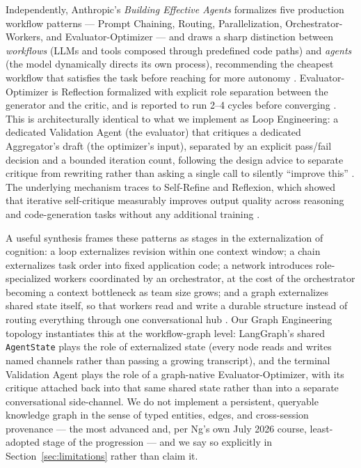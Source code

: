 \documentclass[journal,10pt,compsoc,onecolumn]{IEEEtran}
\begin{document}
Independently, Anthropic's \textit{Building Effective Agents} formalizes five production workflow patterns --- Prompt Chaining, Routing, Parallelization, Orchestrator-Workers, and Evaluator-Optimizer --- and draws a sharp distinction between \textit{workflows} (LLMs and tools composed through predefined code paths) and \textit{agents} (the model dynamically directs its own process), recommending the cheapest workflow that satisfies the task before reaching for more autonomy \cite{schluntz_zhang_2024}. Evaluator-Optimizer is Reflection formalized with explicit role separation between the generator and the critic, and is reported to run 2--4 cycles before converging \cite{schluntz_zhang_2024}. This is architecturally identical to what we implement as Loop Engineering: a dedicated Validation Agent (the evaluator) that critiques a dedicated Aggregator's draft (the optimizer's input), separated by an explicit pass/fail decision and a bounded iteration count, following the design advice to separate critique from rewriting rather than asking a single call to silently ``improve this'' \cite{ng_playbook_2026}. The underlying mechanism traces to Self-Refine and Reflexion, which showed that iterative self-critique measurably improves output quality across reasoning and code-generation tasks without any additional training \cite{madaan_selfrefine_2023, shinn_reflexion_2023}.

A useful synthesis frames these patterns as stages in the externalization of cognition: a loop externalizes revision within one context window; a chain externalizes task order into fixed application code; a network introduces role-specialized workers coordinated by an orchestrator, at the cost of the orchestrator becoming a context bottleneck as team size grows; and a graph externalizes shared state itself, so that workers read and write a durable structure instead of routing everything through one conversational hub \cite{ng_playbook_2026}. Our Graph Engineering topology instantiates this at the workflow-graph level: LangGraph's \cite{langgraph} shared \texttt{AgentState} plays the role of externalized state (every node reads and writes named channels rather than passing a growing transcript), and the terminal Validation Agent plays the role of a graph-native Evaluator-Optimizer, with its critique attached back into that same shared state rather than into a separate conversational side-channel. We do not implement a persistent, queryable knowledge graph in the sense of typed entities, edges, and cross-session provenance --- the most advanced and, per Ng's own July 2026 course, least-adopted stage of the progression \cite{ng_playbook_2026} --- and we say so explicitly in Section~\ref{sec:limitations} rather than claim it.
\end{document}
